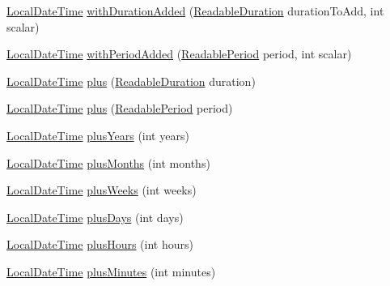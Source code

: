 \begin{DoxyCompactItemize}
\hyperlink{classorg_1_1joda_1_1time_1_1_local_date_time}{Local\-Date\-Time} \hyperlink{classorg_1_1joda_1_1time_1_1_local_date_time_af8228ee2034e107066fa4a4bb030b19c}{with\-Duration\-Added} (\hyperlink{interfaceorg_1_1joda_1_1time_1_1_readable_duration}{Readable\-Duration} duration\-To\-Add, int scalar)
\item 
\hyperlink{classorg_1_1joda_1_1time_1_1_local_date_time}{Local\-Date\-Time} \hyperlink{classorg_1_1joda_1_1time_1_1_local_date_time_a3e9dfcebc3f26c836695e5abb513c0e7}{with\-Period\-Added} (\hyperlink{interfaceorg_1_1joda_1_1time_1_1_readable_period}{Readable\-Period} period, int scalar)
\item 
\hyperlink{classorg_1_1joda_1_1time_1_1_local_date_time}{Local\-Date\-Time} \hyperlink{classorg_1_1joda_1_1time_1_1_local_date_time_a940b976d321d1abd7d02586ed26cc10d}{plus} (\hyperlink{interfaceorg_1_1joda_1_1time_1_1_readable_duration}{Readable\-Duration} duration)
\item 
\hyperlink{classorg_1_1joda_1_1time_1_1_local_date_time}{Local\-Date\-Time} \hyperlink{classorg_1_1joda_1_1time_1_1_local_date_time_ad80f1d42a1391624b7840d1ab84002d0}{plus} (\hyperlink{interfaceorg_1_1joda_1_1time_1_1_readable_period}{Readable\-Period} period)
\item 
\hyperlink{classorg_1_1joda_1_1time_1_1_local_date_time}{Local\-Date\-Time} \hyperlink{classorg_1_1joda_1_1time_1_1_local_date_time_a27f9c1a2689bfe5606ace03c55c84e0c}{plus\-Years} (int years)
\item 
\hyperlink{classorg_1_1joda_1_1time_1_1_local_date_time}{Local\-Date\-Time} \hyperlink{classorg_1_1joda_1_1time_1_1_local_date_time_a0ef761dd5c8f8723c1d5da38ac21dbbf}{plus\-Months} (int months)
\item 
\hyperlink{classorg_1_1joda_1_1time_1_1_local_date_time}{Local\-Date\-Time} \hyperlink{classorg_1_1joda_1_1time_1_1_local_date_time_a7ab96dbdc912eb253d10548385c4ce30}{plus\-Weeks} (int weeks)
\item 
\hyperlink{classorg_1_1joda_1_1time_1_1_local_date_time}{Local\-Date\-Time} \hyperlink{classorg_1_1joda_1_1time_1_1_local_date_time_ada6bc40769ac3ed1c57f85723d490da7}{plus\-Days} (int days)
\item 
\hyperlink{classorg_1_1joda_1_1time_1_1_local_date_time}{Local\-Date\-Time} \hyperlink{classorg_1_1joda_1_1time_1_1_local_date_time_a27cfca881b1f0a59225ec9f3f061644e}{plus\-Hours} (int hours)
\item 
\hyperlink{classorg_1_1joda_1_1time_1_1_local_date_time}{Local\-Date\-Time} \hyperlink{classorg_1_1joda_1_1time_1_1_local_date_time_a7fdaf39c760811b3481d0cb99747fa94}{plus\-Minutes} (int minutes)

\end{DoxyCompactItemize}
